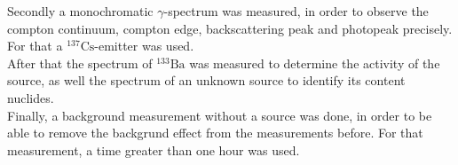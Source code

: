 Secondly a monochromatic $\gamma$-spectrum was measured, in order to observe the compton continuum, compton edge, backscattering peak and photopeak precisely.
For that a $^{137}\mathrm{Cs}$-emitter was used. \\

After that the spectrum of $^{133}\mathrm{Ba}$ was measured to determine the activity of the source, as well the spectrum of an unknown source to identify its content nuclides. \\

Finally, a background measurement without a source was done, in order to be able to remove the backgrund effect from the measurements before. 
For that measurement, a time greater than one hour was used. 

\clearpage